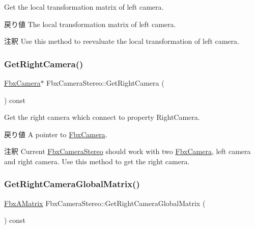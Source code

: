 Get the local transformation matrix of left camera. \begin{DoxyReturn}{戻り値}
The local transformation matrix of left camera. 
\end{DoxyReturn}
\begin{DoxyRemark}{注釈}
Use this method to reevaluate the local transformation of left camera. 
\end{DoxyRemark}
\mbox{\label{class_fbx_camera_stereo_a8c293c596ad0c3b9fb169bdf5b508a68}} 
\subsubsection{\texorpdfstring{Get\+Right\+Camera()}{GetRightCamera()}}
{\footnotesize\ttfamily \hyperlink{class_fbx_camera}{Fbx\+Camera}$\ast$ Fbx\+Camera\+Stereo\+::\+Get\+Right\+Camera (\begin{DoxyParamCaption}{ }\end{DoxyParamCaption}) const}

Get the right camera which connect to property Right\+Camera. \begin{DoxyReturn}{戻り値}
A pointer to \hyperlink{class_fbx_camera}{Fbx\+Camera}. 
\end{DoxyReturn}
\begin{DoxyRemark}{注釈}
Current \hyperlink{class_fbx_camera_stereo}{Fbx\+Camera\+Stereo} should work with two \hyperlink{class_fbx_camera}{Fbx\+Camera}, left camera and right camera. Use this method to get the right camera. 
\end{DoxyRemark}
\mbox{\label{class_fbx_camera_stereo_ae46b1246ccc65e2cb3e76cc3673172fd}} 
\subsubsection{\texorpdfstring{Get\+Right\+Camera\+Global\+Matrix()}{GetRightCameraGlobalMatrix()}}
{\footnotesize\ttfamily \hyperlink{class_fbx_a_matrix}{Fbx\+A\+Matrix} Fbx\+Camera\+Stereo\+::\+Get\+Right\+Camera\+Global\+Matrix (\begin{DoxyParamCaption}{ }\end{DoxyParamCaption}) const}

